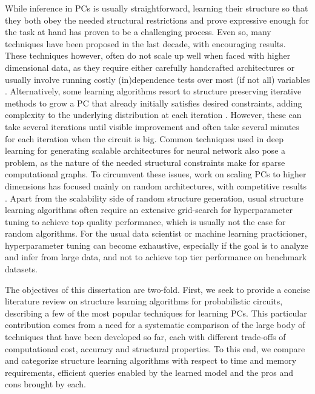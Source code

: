 While inference in PCs is usually straightforward, learning their structure so that they both
obey the needed structural restrictions and prove expressive enough for the task at hand has proven
to be a challenging process. Even so, many techniques have been proposed in the last decade, with
encouraging results. These techniques however, often do not scale up well when faced with higher
dimensional data, as they require either carefully handcrafted architectures
\citep{poon11,cheng14,nath16} or usually involve running costly (in)dependence tests over most (if
not all) variables \citep{gens13,jaini18a,vergari15,dimauro17a}. Alternatively, some learning
algorithms resort to structure preserving iterative methods to grow a PC that already initially
satisfies desired constraints, adding complexity to the underlying distribution at each iteration
\citep{liang17,dang20}. However, these can take several iterations until visible improvement and
often take several minutes for each iteration when the circuit is big. Common techniques used in
deep learning for generating scalable architectures for neural network also pose a problem, as the
nature of the needed structural constraints make for sparse computational graphs. To circumvent
these issues, work on scaling PCs to higher dimensions has focused mainly on random architectures,
with competitive results \citep{peharz20a,dimauro21,geh21a,peharz20b}. Apart from the scalability
side of random structure generation, usual structure learning algorithms often require an extensive
grid-search for hyperparameter tuning to achieve top quality performance, which is usually not the
case for random algorithms. For the usual data scientist or machine learning practicioner,
hyperparameter tuning can become exhaustive, especially if the goal is to analyze and infer from
large data, and not to achieve top tier performance on benchmark datasets.

The objectives of this dissertation are two-fold. First, we seek to provide a concise literature
review on structure learning algorithms for probabilistic circuits, describing a few of the most
popular techniques for learning PCs. This particular contribution comes from a need for a
systematic comparison of the large body of techniques that have been developed so far, each with
different trade-offs of computational cost, accuracy and structural properties. To this end, we
compare and categorize structure learning algorithms with respect to time and memory requirements,
efficient queries enabled by the learned model and the pros and cons brought by each.

